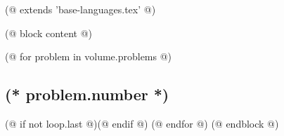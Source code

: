 (@ extends 'base-languages.tex' @)

(@ block content @)

    \pagestyle{online}

    (@ for problem in volume.problems @)%
        \setcounter{volume}{(* volume.number *)}%
        \setcounter{problem}{(* problem.number *)}%
        \subsection{\texorpdfstring{(* problem.number *)}{(* problem.number *). (* problem.id *)}}%
        \label{ssc:problem-(* problem.id*)}%
        (@ if not loop.last @)\newpage(@ endif @)
    (@ endfor @)
    \newpage
(@ endblock @)
